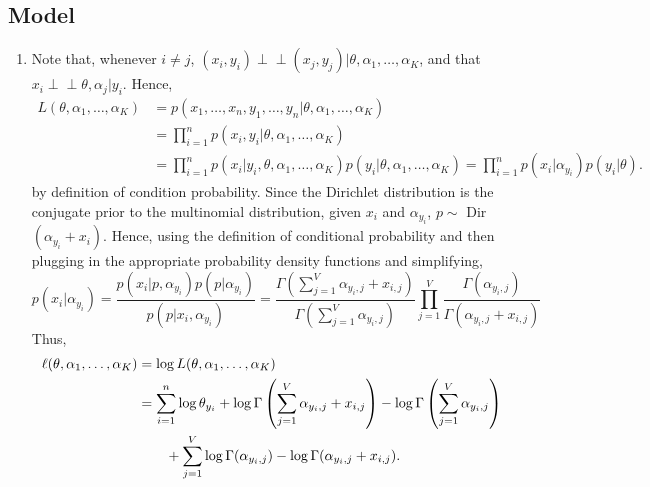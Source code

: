\documentclass[11pt]{article}
\newcommand{\ind}{\perp\!\!\!\perp} %
\begin{document}
\subsection{Model}
\begin{enumerate}
\item Note that, whenever $i \neq j$,
$(x_i,y_i) \ind (x_j,y_j) | \theta,\alpha_1,\dots,\alpha_K$, and that
$x_i \ind \theta, \alpha_j | y_i$. Hence,
\begin{align*}
L(\theta,\alpha_1,\dots,\alpha_K)
 &  = p(x_1,\dots,x_n,y_1,\dots,y_n | \theta,\alpha_1,\dots,\alpha_K)   \\
 &  = \prod_{i = 1}^n p(x_i,y_i | \theta,\alpha_1,\dots,\alpha_K)       \\
 &  = \prod_{i = 1}^n p(x_i | y_i,\theta,\alpha_1,\dots,\alpha_K)
                            p(y_i | \theta,\alpha_1,\dots,\alpha_K)
    = \prod_{i = 1}^n p(x_i | \alpha_{y_i}) p(y_i | \theta).
\end{align*}
by definition of condition probability. Since the Dirichlet distribution is the
conjugate prior to the multinomial distribution, given $x_i$ and
$\alpha_{y_i}$, $p \sim$ Dir$(\alpha_{y_i} + x_i)$. Hence, using the definition
of conditional probability and then plugging in the appropriate probability
density functions and simplifying,
\[p(x_i | \alpha_{y_i})
    = \frac{p(x_i | p, \alpha_{y_i})p(p | \alpha_{y_i})}
            {p(p | x_i,\alpha_{y_i})}
    = \frac{\Gamma \left( \sum_{j = 1}^V \alpha_{y_i,j} + x_{i,j} \right)}
           {\Gamma \left( \sum_{j = 1}^V \alpha_{y_i,j} \right)}
        \prod_{j = 1}^V \frac{\Gamma(\alpha_{y_i,j})}
                             {\Gamma(\alpha_{y_i,j} + x_{i,j})}
\]
Thus,
\begin{align}
\notag
\ell(\theta,\alpha_1,\dots,\alpha_K)
 &  = \log L(\theta,\alpha_1,\dots,\alpha_K)    \\
\notag
 &  = \sum_{i = 1}^n \log \theta_{y_i}
        + \log \Gamma \left( \sum_{j = 1}^V \alpha_{y_i,j} + x_{i,j} \right)
        - \log \Gamma \left( \sum_{j = 1}^V \alpha_{y_i,j} \right)  \\
 &  \quad\quad + \sum_{j = 1}^V
                   \log \Gamma(\alpha_{y_i,j})
                    - \log \Gamma(\alpha_{y_i,j} + x_{i,j}).
\end{align}


\end{enumerate}
\end{document}
